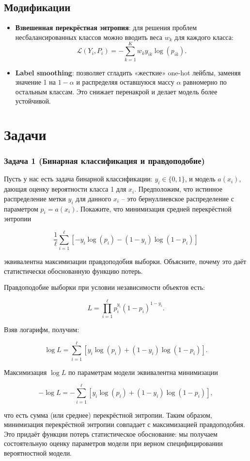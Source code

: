 \subsection*{Модификации}

\begin{itemize}
    \item \textbf{Взвешенная перекрёстная энтропия}: для решения проблем несбалансированных классов можно вводить веса $w_k$ для каждого класса:
    $$
    \mathcal{L}(Y_i, P_i) = -\sum_{k=1}^{K} w_k y_{ik}\log(p_{ik}).
    $$
    
    \item \textbf{Label smoothing}: позволяет сгладить «жесткие» one-hot лейблы, заменяя значение 1 на $1-\alpha$ и распределяя оставшуюся массу $\alpha$ равномерно по остальным классам. Это снижает перенакрой и делает модель более устойчивой.
\end{itemize}

\newpage

\section*{Задачи}

\subsubsection*{Задача 1 (Бинарная классификация и правдоподобие)}

Пусть у нас есть задача бинарной классификации: $y_i \in \{0,1\}$, и модель $a(x_i)$, дающая оценку вероятности класса 1 для $x_i$. Предположим, что истинное распределение метки $y_i$ для данного $x_i$ – это бернуллиевское распределение с параметром $p_i = a(x_i)$. Покажите, что минимизация средней перекрёстной энтропии

$$
\frac{1}{\ell}\sum_{i=1}^{\ell} \left[-y_i\log(p_i) - (1 - y_i)\log(1 - p_i)\right]
$$

эквивалентна максимизации правдоподобия выборки. Объясните, почему это даёт статистически обоснованную функцию потерь.

\begin{solution}
Правдоподобие выборки при условии независимости объектов есть:

$$
L = \prod_{i=1}^{\ell} p_i^{y_i}(1 - p_i)^{1 - y_i}.
$$

Взяв логарифм, получим:

$$
\log L = \sum_{i=1}^{\ell} [y_i\log(p_i) + (1 - y_i)\log(1 - p_i)].
$$

Максимизация $\log L$ по параметрам модели эквивалентна минимизации

$$
-\log L = -\sum_{i=1}^{\ell} [y_i\log(p_i) + (1 - y_i)\log(1 - p_i)],
$$

что есть сумма (или среднее) перекрёстной энтропии. Таким образом, минимизация перекрёстной энтропии совпадает с максимизацией правдоподобия. Это придаёт функции потерь статистическое обоснование: мы получаем состоятельную оценку параметров модели при верном специфицировании вероятностной модели.
\end{solution}

